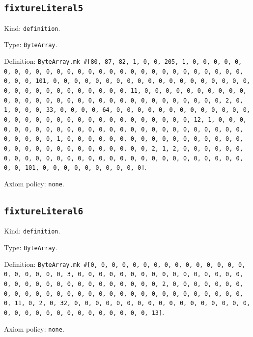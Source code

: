 \documentclass[11pt]{article}
\begin{document}
\subsection*{\texttt{fixtureLiteral5}}
\noindent Kind: \texttt{definition}.\par
\noindent Type: \texttt{ByteArray}.\par
\noindent Definition: \texttt{ByteArray.mk \#[80, 87, 82, 1, 0, 0, 205, 1, 0, 0, 0, 0, 0, 0, 0, 0, 0, 0, 0, 0, 0, 0, 0, 0, 0, 0, 0, 0, 0, 0, 0, 0, 0, 0, 0, 0, 0, 0, 0, 101, 0, 0, 0, 0, 0, 0, 0, 0, 0, 0, 0, 0, 0, 0, 0, 0, 0, 0, 0, 0, 0, 0, 0, 0, 0, 0, 0, 0, 0, 0, 0, 11, 0, 0, 0, 0, 0, 0, 0, 0, 0, 0, 0, 0, 0, 0, 0, 0, 0, 0, 0, 0, 0, 0, 0, 0, 0, 0, 0, 0, 0, 0, 0, 2, 0, 1, 0, 0, 0, 33, 0, 0, 0, 0, 64, 0, 0, 0, 0, 0, 0, 0, 0, 0, 0, 0, 0, 0, 0, 0, 0, 0, 0, 0, 0, 0, 0, 0, 0, 0, 0, 0, 0, 0, 0, 0, 12, 1, 0, 0, 0, 0, 0, 0, 0, 0, 0, 0, 0, 0, 0, 0, 0, 0, 0, 0, 0, 0, 0, 0, 0, 0, 0, 0, 0, 0, 0, 0, 0, 1, 0, 0, 0, 0, 0, 0, 0, 0, 0, 0, 0, 0, 0, 0, 0, 0, 0, 0, 0, 0, 0, 0, 0, 0, 0, 0, 0, 0, 0, 0, 0, 2, 1, 2, 0, 0, 0, 0, 0, 0, 0, 0, 0, 0, 0, 0, 0, 0, 0, 0, 0, 0, 0, 0, 0, 0, 0, 0, 0, 0, 0, 0, 0, 0, 0, 101, 0, 0, 0, 0, 0, 0, 0, 0, 0, 0]}.\par
\noindent Axiom policy: \texttt{none}.\par
\subsection*{\texttt{fixtureLiteral6}}
\noindent Kind: \texttt{definition}.\par
\noindent Type: \texttt{ByteArray}.\par
\noindent Definition: \texttt{ByteArray.mk \#[0, 0, 0, 0, 0, 0, 0, 0, 0, 0, 0, 0, 0, 0, 0, 0, 0, 0, 0, 0, 0, 3, 0, 0, 0, 0, 0, 0, 0, 0, 0, 0, 0, 0, 0, 0, 0, 0, 0, 0, 0, 0, 0, 0, 0, 0, 0, 0, 0, 0, 0, 0, 0, 2, 0, 0, 0, 0, 0, 0, 0, 0, 0, 0, 0, 0, 0, 0, 0, 0, 0, 0, 0, 0, 0, 0, 0, 0, 0, 0, 0, 0, 0, 0, 0, 11, 0, 2, 0, 32, 0, 0, 0, 0, 0, 0, 0, 0, 0, 0, 0, 0, 0, 0, 0, 0, 0, 0, 0, 0, 0, 0, 0, 0, 0, 0, 0, 0, 0, 0, 0, 13]}.\par
\noindent Axiom policy: \texttt{none}.\par
\end{document}
